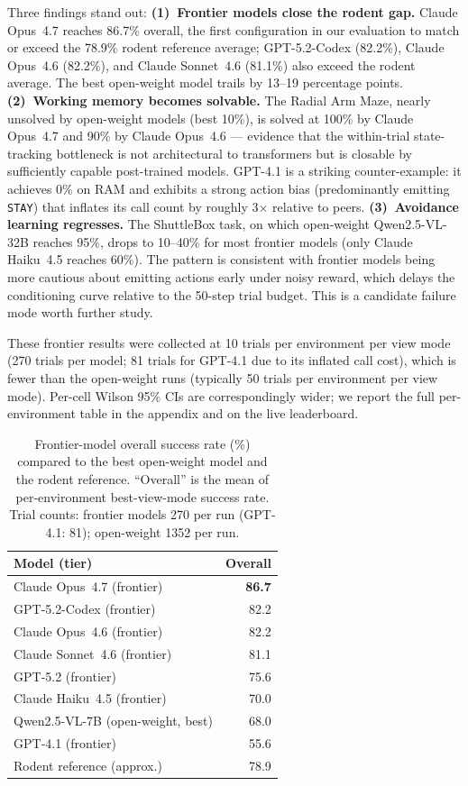\documentclass[letterpaper]{article}
\begin{document}
Three findings stand out:
\textbf{(1)~Frontier models close the rodent gap.}
Claude Opus~4.7 reaches 86.7\% overall, the first configuration in our evaluation to match or exceed the 78.9\% rodent reference average; GPT-5.2-Codex (82.2\%), Claude Opus~4.6 (82.2\%), and Claude Sonnet~4.6 (81.1\%) also exceed the rodent average. The best open-weight model trails by 13--19 percentage points.
\textbf{(2)~Working memory becomes solvable.}
The Radial Arm Maze, nearly unsolved by open-weight models (best 10\%), is solved at 100\% by Claude Opus~4.7 and 90\% by Claude Opus~4.6 --- evidence that the within-trial state-tracking bottleneck is not architectural to transformers but is closable by sufficiently capable post-trained models.
GPT-4.1 is a striking counter-example: it achieves 0\% on RAM and exhibits a strong action bias (predominantly emitting \texttt{STAY}) that inflates its call count by roughly 3$\times$ relative to peers.
\textbf{(3)~Avoidance learning regresses.}
The ShuttleBox task, on which open-weight Qwen2.5-VL-32B reaches 95\%, drops to 10--40\% for most frontier models (only Claude Haiku~4.5 reaches 60\%). The pattern is consistent with frontier models being more cautious about emitting actions early under noisy reward, which delays the conditioning curve relative to the 50-step trial budget. This is a candidate failure mode worth further study.

These frontier results were collected at 10 trials per environment per view mode (270 trials per model; 81 trials for GPT-4.1 due to its inflated call cost), which is fewer than the open-weight runs (typically 50 trials per environment per view mode). Per-cell Wilson 95\% CIs are correspondingly wider; we report the full per-environment table in the appendix and on the live leaderboard.

\begin{table}[t]
\centering
\caption{Frontier-model overall success rate (\%) compared to the best open-weight model and the rodent reference. ``Overall'' is the mean of per-environment best-view-mode success rate. Trial counts: frontier models 270 per run (GPT-4.1: 81); open-weight 1352 per run.}
\label{tab:frontier}
\footnotesize
\begin{tabular}{@{}lr@{}}
\toprule
\textbf{Model (tier)} & \textbf{Overall} \\
\midrule
Claude Opus~4.7 (frontier) & \textbf{86.7} \\
GPT-5.2-Codex (frontier) & 82.2 \\
Claude Opus~4.6 (frontier) & 82.2 \\
Claude Sonnet~4.6 (frontier) & 81.1 \\
GPT-5.2 (frontier) & 75.6 \\
Claude Haiku~4.5 (frontier) & 70.0 \\
Qwen2.5-VL-7B (open-weight, best) & 68.0 \\
GPT-4.1 (frontier) & 55.6 \\
\midrule
Rodent reference (approx.) & 78.9 \\
\bottomrule
\end{tabular}
\end{table}
\end{document}
